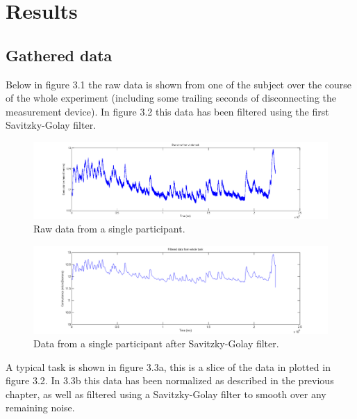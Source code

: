 \documentclass[11pt,leqno,a4paper]{report} %
\begin{document}
\chapter{Results}

\section{Gathered data}

Below in figure 3.1 the raw data is shown from one of the subject over the course of the whole experiment (including some trailing seconds of disconnecting the measurement device). In figure 3.2 this data has been filtered using the first Savitzky-Golay filter.


\begin{figure}[H]
  \centering
    \hspace*{-.25\textwidth}   
    \includegraphics[width=1.5\textwidth]{measurements/raw.png}
  \caption{Raw data from a single participant.}
\end{figure}

\begin{figure}[H]
  \centering
 	\hspace*{-.25\textwidth}   
 	\includegraphics[width=1.5\textwidth]{measurements/filtered.png}
  \caption{Data from a single participant after Savitzky-Golay filter.}
\end{figure}

A typical task is shown in figure 3.3a, this is a slice of the data in plotted in figure 3.2. In 3.3b this data has been normalized as described in the previous chapter, as well as filtered using a Savitzky-Golay filter to smooth over any remaining noise.
\end{document}
